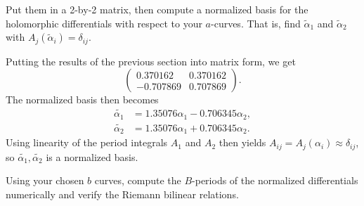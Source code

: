 \documentclass[expanded]{lkx_pset}
\begin{document}
\begin{parts}
	\begin{part}{}
		Put them in a 2-by-2 matrix, then compute a normalized basis for the holomorphic differentials with respect to your $a$-curves. That is, find $\widetilde\alpha_{1}$ and $\widetilde\alpha_{2}$ with $A_{j}(\widetilde\alpha_{i})=\delta_{ij}$.\medskip
	\end{part}

	Putting the results of the previous section into matrix form, we get
	\[
		\begin{pmatrix}
			0.370162  & 0.370162 \\
			-0.707869 & 0.707869
		\end{pmatrix}.
	\]
	The normalized basis then becomes
	\[
		\begin{aligned}
			\widetilde{\alpha_1} & = 1.35076\alpha_1-0.706345\alpha_2, \\
			\widetilde{\alpha_2} & = 1.35076\alpha_1+0.706345\alpha_2.
		\end{aligned}
	\]
	Using linearity of the period integrals $A_1$ and $A_2$ then yields $A_{ij}=A_j(\alpha_i)\approx \delta_{ij}$, so $\widetilde{\alpha_1},\widetilde{\alpha_2}$ is a normalized basis.

	\begin{part}{}
		Using your chosen $b$ curves, compute the $B$-periods of the normalized differentials numerically and verify the Riemann bilinear relations.
	\end{part}


\end{parts}
\end{document}
